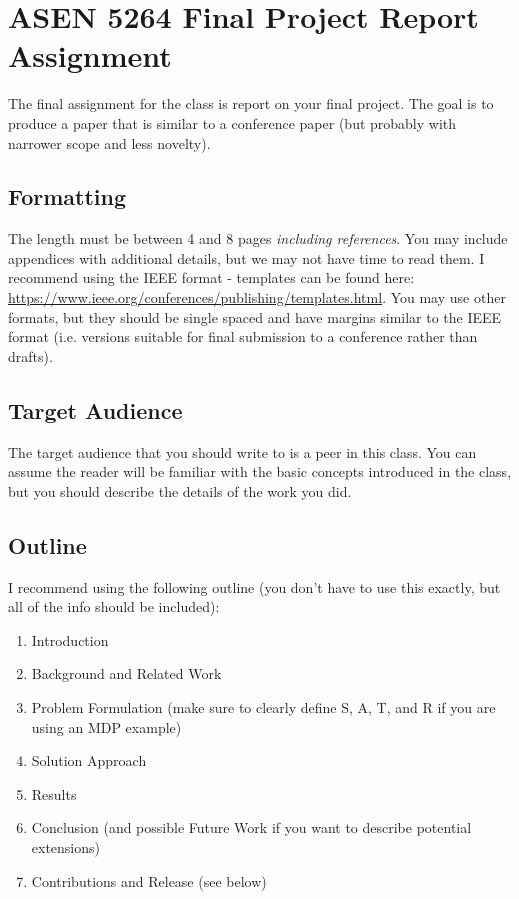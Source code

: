 \documentclass{article}
\begin{document}
\section*{ASEN 5264 Final Project Report Assignment}


The final assignment for the class is report on your final project. The goal is to produce a paper that is similar to a conference paper (but probably with narrower scope and less novelty).

\subsection*{Formatting}

The length must be between 4 and 8 pages \emph{including references}. You may include appendices with additional details, but we may not have time to read them. I recommend using the IEEE format - templates can be found here: \url{https://www.ieee.org/conferences/publishing/templates.html}. You may use other formats, but they should be single spaced and have margins similar to the IEEE format (i.e. versions suitable for final submission to a conference rather than drafts).

\subsection*{Target Audience}

The target audience that you should write to is a peer in this class. You can assume the reader will be familiar with the basic concepts introduced in the class, but you should describe the details of the work you did.

\subsection*{Outline}

I recommend using the following outline (you don't have to use this exactly, but all of the info should be included):

\begin{enumerate}[nosep]
    \item Introduction
    \item Background and Related Work
    \item Problem Formulation (make sure to clearly define S, A, T, and R if you are using an MDP example)
    \item Solution Approach
    \item Results
    \item Conclusion (and possible Future Work if you want to describe potential extensions)
    \item Contributions and Release (see below)
\end{enumerate}
\end{document}
